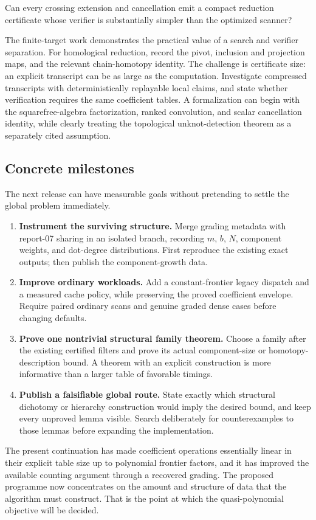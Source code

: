 \begin{question}
Can every crossing extension and cancellation emit a compact reduction
certificate whose verifier is substantially simpler than the optimized
scanner?
\end{question}
The finite-target work demonstrates the practical value of a search and
verifier separation. For homological reduction, record the pivot,
inclusion and projection maps, and the relevant chain-homotopy identity.
The challenge is certificate size: an explicit transcript can be as
large as the computation. Investigate compressed transcripts with
deterministically replayable local claims, and state whether verification
requires the same coefficient tables. A formalization can begin with the
squarefree-algebra factorization, ranked convolution, and scalar
cancellation identity, while clearly treating the topological
unknot-detection theorem as a separately cited assumption.

\subsection{Concrete milestones}

The next release can have measurable goals without pretending to settle
the global problem immediately.
\begin{enumerate}
\item \textbf{Instrument the surviving structure.} Merge grading metadata
with report-07 sharing in an isolated branch, recording $m$, $b$, $N$,
component weights, and dot-degree distributions. First reproduce the
existing exact outputs; then publish the component-growth data.
\item \textbf{Improve ordinary workloads.} Add a constant-frontier legacy
dispatch and a measured cache policy, while preserving the proved
coefficient envelope. Require paired ordinary scans and genuine graded
dense cases before changing defaults.
\item \textbf{Prove one nontrivial structural family theorem.} Choose a
family after the existing certified filters and prove its actual
component-size or homotopy-description bound. A theorem with an explicit
construction is more informative than a larger table of favorable
timings.
\item \textbf{Publish a falsifiable global route.} State exactly which
structural dichotomy or hierarchy construction would imply the desired
bound, and keep every unproved lemma visible. Search deliberately for
counterexamples to those lemmas before expanding the implementation.
\end{enumerate}

The present continuation has made coefficient operations essentially
linear in their explicit table size up to polynomial frontier factors,
and it has improved the available counting argument through a recovered
grading. The proposed programme now concentrates on the amount and
structure of data that the algorithm must construct. That is the point
at which the quasi-polynomial objective will be decided.
